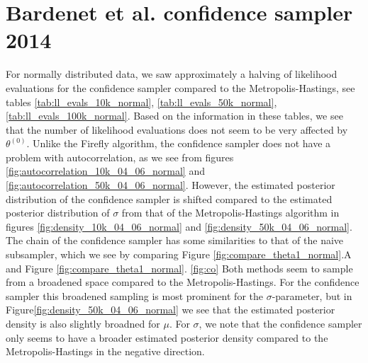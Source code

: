 \section{Bardenet et al. confidence sampler 2014}
For normally distributed data, we saw approximately a halving of likelihood evaluations for the confidence sampler compared to the Metropolis-Hastings, see tables \ref{tab:ll_evals_10k_normal}, \ref{tab:ll_evals_50k_normal}, \ref{tab:ll_evals_100k_normal}.
Based on the information in these tables, we see that the number of likelihood evaluations does not seem to be very affected by $\theta^{\left(0\right)}$. 
Unlike the Firefly algorithm, the confidence sampler does not have a problem with autocorrelation, as we see from figures \ref{fig:autocorrelation_10k_04_06_normal} and \ref{fig:autocorrelation_50k_04_06_normal}. 
However, the estimated posterior distribution of the confidence sampler is shifted compared to the estimated posterior distribution of $\sigma$ from that of the Metropolis-Hastings algorithm in figures \ref{fig:density_10k_04_06_normal} and \ref{fig:density_50k_04_06_normal}. The chain of the confidence sampler has some similarities to that of the naive subsampler, which we see by 
comparing Figure \ref{fig:compare_theta1_normal}.A and Figure \ref{fig:compare_theta1_normal}.
\ref{fig:co}
Both methods seem to sample from a broadened space compared to the Metropolis-Hastings. For the confidence sampler this broadened sampling is most prominent for the $\sigma$-parameter, but in Figure\ref{fig:density_50k_04_06_normal} we see that the estimated posterior density is also slightly broadned for $\mu$. For $\sigma$,  we note that the confidence sampler only seems to have a broader estimated posterior density compared to the Metropolis-Hastings in the negative direction.     

